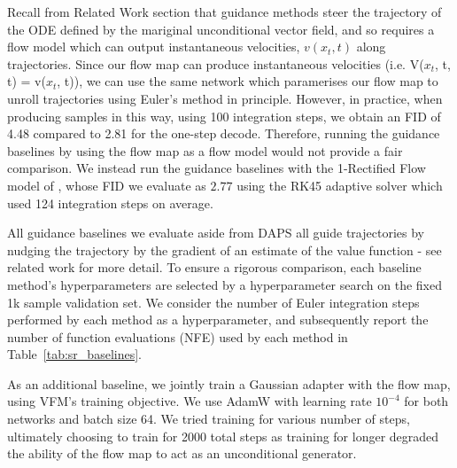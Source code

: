 \documentclass[12pt,a4paper]{report}
\begin{document}
Recall from Related Work section that guidance methods steer the trajectory of the ODE defined by the mariginal unconditional vector field, and so requires a flow model which can output instantaneous velocities, $v(x_t, t)$ along trajectories. 
Since our flow map can produce instantaneous velocities (i.e. V($x_t$, t, t) = v($x_t$, t)), we can use the same network which paramerises our flow map to unroll trajectories using Euler's method in principle. However, in practice, when producing samples in this way, using 100 integration steps, we obtain an FID of 4.48 compared to 2.81 for the one-step decode. 
Therefore, running the guidance baselines by using the flow map as a flow model would not provide a fair comparison. We instead run the guidance baselines with the 1-Rectified Flow model of
\textcite{liu2023flow}, whose FID we evaluate as $2.77$ using the RK45 adaptive solver which used 124 integration steps on average. 

All guidance baselines we evaluate aside from DAPS all guide trajectories by nudging the trajectory by the gradient of an estimate of the value function - see related work for more detail. 
To ensure a rigorous comparison, each baseline method's hyperparameters are selected by a hyperparameter search on the fixed 1k sample validation set. 
We consider the number of Euler integration steps performed by each method as a hyperparameter, and subsequently report the number of function evaluations (NFE) used by each method in Table~\ref{tab:sr_baselines}. 

As an additional baseline, we jointly train a Gaussian adapter with the flow map, using VFM's training objective. We use AdamW with learning rate $10^{-4}$ for both networks and batch size 64. We tried training for various number of steps, ultimately choosing to train for 2000 total steps as training for longer degraded the ability of the flow map to act as an unconditional generator. 
\end{document}
